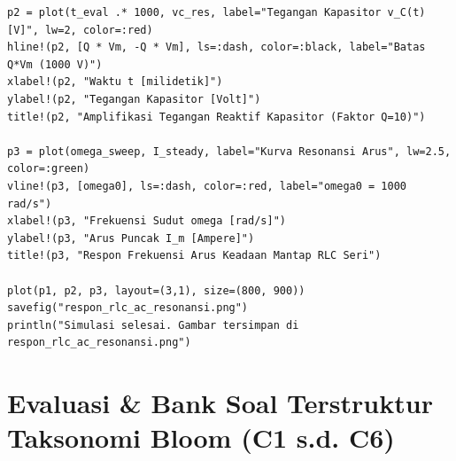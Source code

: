\documentclass[11pt,a4paper]{article}
\theoremstyle{definition}
\begin{document}
\begin{lstlisting}[style=juliastyle, caption={Simulasi Lengkap Transien RLC Seri AC dan Kurva Resonansi dengan Julia.}, label={lst:julia_rlc_ac}]
p2 = plot(t_eval .* 1000, vc_res, label="Tegangan Kapasitor v_C(t) [V]", lw=2, color=:red)
hline!(p2, [Q * Vm, -Q * Vm], ls=:dash, color=:black, label="Batas Q*Vm (1000 V)")
xlabel!(p2, "Waktu t [milidetik]")
ylabel!(p2, "Tegangan Kapasitor [Volt]")
title!(p2, "Amplifikasi Tegangan Reaktif Kapasitor (Faktor Q=10)")

p3 = plot(omega_sweep, I_steady, label="Kurva Resonansi Arus", lw=2.5, color=:green)
vline!(p3, [omega0], ls=:dash, color=:red, label="omega0 = 1000 rad/s")
xlabel!(p3, "Frekuensi Sudut omega [rad/s]")
ylabel!(p3, "Arus Puncak I_m [Ampere]")
title!(p3, "Respon Frekuensi Arus Keadaan Mantap RLC Seri")

plot(p1, p2, p3, layout=(3,1), size=(800, 900))
savefig("respon_rlc_ac_resonansi.png")
println("Simulasi selesai. Gambar tersimpan di respon_rlc_ac_resonansi.png")
\end{lstlisting}

\section{Evaluasi \& Bank Soal Terstruktur Taksonomi Bloom (C1 s.d. C6)}
\end{document}
